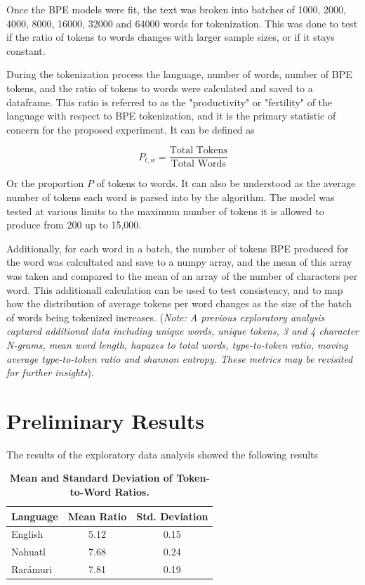 \documentclass[11pt]{article}
\begin{document}
Once the BPE models were fit, the text was broken into batches of 1000, 2000, 4000, 8000, 16000, 32000 and 64000 words for tokenization. This was done to test if the ratio of tokens to words changes with larger sample sizes, or if it stays constant.

During the tokenization process the language, number of words, number of BPE tokens, and the ratio of tokens to words were calculated and saved to a dataframe. This ratio is referred to as the "productivity" or "fertility" of the language with respect to BPE tokenization, and it is the primary statistic of concern for the proposed experiment. It can be defined as 

\[
    P_{t, w} = \frac{\text{Total Tokens}}{\text{Total Words}} 
\]

Or the proportion $P$ of tokens to words. It can also be understood as the average number of tokens each word is parsed into by the algorithm. The model was tested at various limits to the maximum number of tokens it is allowed to produce from 200 up to 15,000. 

Additionally, for each word in a batch, the number of tokens BPE produced for the word was calcultated and save to a numpy array, and the mean of this array was taken and compared to the mean of an array of the number of characters per word. This additionall calculation can be used to test consistency, and to map how the distribution of average tokens per word changes as the size of the batch of words being tokenized increases. (\textit{Note: A previous exploratory analysis captured additional data including unique words, unique tokens, 3 and 4 character N-grams, mean word length, hapaxes to total words, type-to-token ratio, moving average type-to-token ratio and shannon entropy. These metrics may be revisited for further insights}).

\section{Preliminary Results}

The results of the exploratory data analysis showed the following results 
\begin{table}[htbp]
    \centering
    \caption{\textbf{Mean and Standard Deviation of Token-to-Word Ratios.}}
    \label{tab:Tokens to Words}
    \begin{tabular}{l c c}
        \toprule
        \textbf{Language} & \textbf{Mean Ratio} & \textbf{Std. Deviation} \\
        \midrule
        English  & 5.12  & 0.15 \\
        Nahuatl  & 7.68  & 0.24 \\
        Rarámuri & 7.81  & 0.19 \\
        \bottomrule
    \end{tabular}
\end{table}
\end{document}
